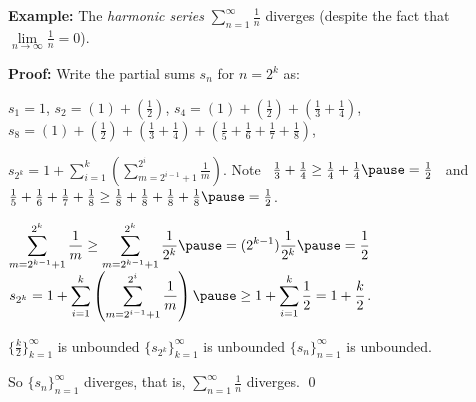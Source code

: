 \documentclass[10pt,aspectratio=169]{beamer}
\begin{document}
\begin{frame}

\textbf{Example:}
The \emph{harmonic series} $\displaystyle\sum_{n=1}^\infty \frac{1}{n}$ diverges
(despite the fact that $\lim\limits_{n\to\infty} \frac{1}{n} = 0$).

\pause
\medskip

\textbf{Proof:}
Write the partial sums $s_n$ for $n = 2^k$ as:

\pause
\medskip

$s_1 = 1$, \quad
\pause
$s_2 = \left( 1 \right) + \left( \frac{1}{2} \right)$, \quad 
\pause
$s_4 = \left( 1 \right) + \left( \frac{1}{2} \right) +
        \left( \frac{1}{3} + \frac{1}{4} \right)$, \quad
\pause
$s_8 = \left( 1 \right) + \left( \frac{1}{2} \right) +
        \left( \frac{1}{3} + \frac{1}{4} \right) +
        \left( \frac{1}{5} + \frac{1}{6} + \frac{1}{7} + \frac{1}{8}
\right)$,

\pause
\medskip

$\displaystyle s_{2^k} = 
1 + 
\sum_{i=1}^k
\left(
\sum_{m=2^{i-1}+1}^{2^i} \frac{1}{m}
\right)$.
%
\pause
\qquad
Note
~$\frac{1}{3} + \frac{1}{4} \geq \frac{1}{4} + \frac{1}{4}
\pause
=
\frac{1}{2}$~
\pause
and
~$\frac{1}{5} + \frac{1}{6} + \frac{1}{7} + \frac{1}{8}
\geq \frac{1}{8} + \frac{1}{8} + \frac{1}{8} + \frac{1}{8}
\pause
=
\frac{1}{2}$.

\pause
\medskip

$\displaystyle
\sum_{m=2^{k-1}+1}^{2^k} \frac{1}{m}
\geq
\sum_{m=2^{k-1}+1}^{2^k} \frac{1}{2^k}
\pause
=
(2^{k-1}) \frac{1}{2^k}
\pause
=
\frac{1}{2}$
%
\pause
%
\hfill\thus\hfill
$\displaystyle
s_{2^k} = 
1 + 
\sum_{i=1}^k
\left(
\sum_{m=2^{i-1}+1}^{2^i} \frac{1}{m}
\right) 
\pause
\geq
1 + \sum_{i=1}^k \frac{1}{2} = 1 + \frac{k}{2}$.

\pause
\medskip

$\{ \frac{k}{2} \}_{k=1}^\infty$ is unbounded
\pause
\wthus
$\{ s_{2^k} \}_{k=1}^\infty$ is unbounded
\pause
\wthus $\{ s_n \}_{n=1}^\infty$ is unbounded.

\medskip

So $\{ s_n \}_{n=1}^\infty$ diverges, that is,
$\displaystyle\sum_{n=1}^\infty \frac{1}{n}$ diverges.
\qed

\end{frame}
\end{document}

